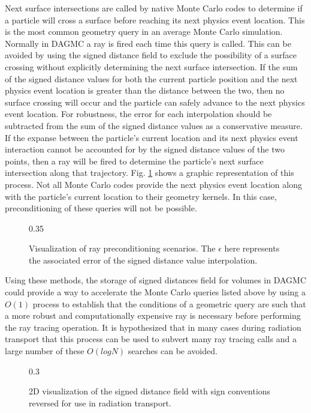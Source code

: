 Next surface intersections are called by native Monte Carlo codes to determine
if a particle will cross a surface before reaching its next physics event
location. This is the most common geometry query in an average Monte Carlo
simulation. Normally in DAGMC a ray is fired each time this query is
called. This can be avoided by using the signed distance field to exclude the
possibility of a surface crossing without explicitly determining the next
surface intersection. If the sum of the signed distance values for both the
current particle position and the next physics event location is greater than
the distance between the two, then no surface crossing will occur and the
particle can safely advance to the next physics event location. For robustness,
the error for each interpolation should be subtracted from the sum of the signed
distance values as a conservative measure. If the expanse between the particle's
current location and its next physics event interaction cannot be accounted for
by the signed distance values of the two points, then a ray will be fired to
determine the particle's next surface intersection along that
trajectory. Fig. \ref{fig:precondition_ray} shows a graphic representation of
this process. Not all Monte Carlo codes provide the next physics event location
along with the particle's current location to their geometry kernels. In this
case, preconditioning of these queries will not be possible.

\begin{figure}[ht]
  \center
  {0.35\textwidth}
  \caption{Visualization of ray preconditioning scenarios. The $\epsilon$ here represents
    the associated error of the signed distance value interpolation.}
  \label{fig:precondition_ray}
\end{figure}

Using these methods, the storage of signed distances field for volumes in DAGMC
could provide a way to accelerate the Monte Carlo queries listed above by using
a $O(1)$ process to establish that the conditions of a geometric query are such
that a more robust and computationally expensive ray is necessary before
performing the ray tracing operation. It is hypothesized that in many cases
during radiation transport that this process can be used to subvert many ray
tracing calls and a large number of these $O(logN)$ searches can be avoided.

\begin{figure}[ht]
  {0.3\textwidth}
  \centering
  \caption{2D visualization of the signed distance field with sign conventions reversed for use in radiation transport.}
  \label{fig:preconditioner_datastruct}
\end{figure}

